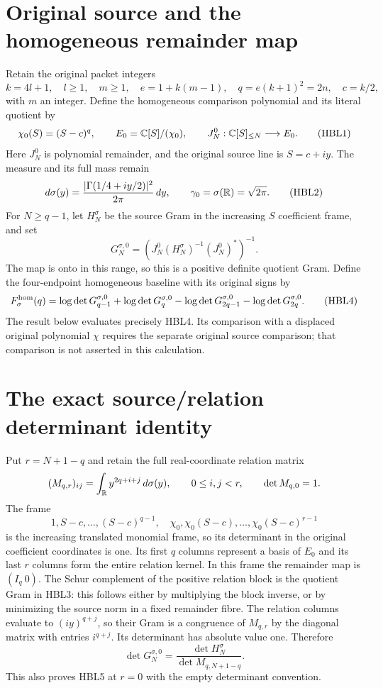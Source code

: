 


\section{Original source and the homogeneous remainder map}

Retain the original packet integers
\[
 k=4l+1,\quad l\ge1,\quad m\ge1,\quad
 e=1+k(m-1),\quad q=e(k+1)^2=2n,\quad c=k/2,
\]
with $m$ an integer. Define the homogeneous comparison polynomial and
its literal quotient by
\[
 \chi_0(S)=(S-c)^q,\qquad E_0=\mathbb C[S]/(\chi_0),\qquad
 J_N^0:\mathbb C[S]_{\le N}\longrightarrow E_0.
 \tag{HBL1}
\]
Here $J_N^0$ is polynomial remainder, and the original source line is
$S=c+iy$. The measure and its full mass remain
\[
 d\sigma(y)=\frac{|\Gamma(1/4+iy/2)|^2}{2\pi}\,dy,
 \qquad \gamma_0=\sigma(\mathbb R)=\sqrt{2\pi}.
 \tag{HBL2}
\]
For $N\ge q-1$, let $H_N^\sigma$ be the source Gram in the increasing
$S$ coefficient frame, and set
\[
 G_N^{\sigma,0}=(J_N^0(H_N^\sigma)^{-1}(J_N^0)^*)^{-1}.
 \tag{HBL3}
\]
The map is onto in this range, so this is a positive definite quotient
Gram. Define the four-endpoint homogeneous baseline with its original
signs by
\[
 F_\sigma^{\rm hom}(q)=
 \log\det G_{q-1}^{\sigma,0}+\log\det G_q^{\sigma,0}
 -\log\det G_{2q-1}^{\sigma,0}-\log\det G_{2q}^{\sigma,0}.
 \tag{HBL4}
\]
The result below evaluates precisely HBL4. Its comparison with a
displaced original polynomial $\chi$ requires the separate original
source comparison; that comparison is not asserted in this calculation.

\section{The exact source/relation determinant identity}

Put $r=N+1-q$ and retain the full real-coordinate relation matrix
\[
 (M_{q,r})_{ij}=\int_{\mathbb R}y^{2q+i+j}\,d\sigma(y),
 \qquad 0\le i,j<r,
 \qquad \det M_{q,0}=1.
\]
The frame
\[
 1,S-c,\ldots,(S-c)^{q-1},\quad
 \chi_0,\chi_0(S-c),\ldots,\chi_0(S-c)^{r-1}
\]
is the increasing translated monomial frame, so its determinant in
the original coefficient coordinates is one. Its first $q$ columns
represent a basis of $E_0$ and its last $r$ columns form the entire
relation kernel. In this frame the remainder map is $(I_q\ 0)$.
The Schur complement of the positive relation block is the quotient
Gram in HBL3: this follows either by multiplying the block inverse,
or by minimizing the source norm in a fixed remainder fibre.
The relation columns evaluate to $(iy)^{q+j}$, so their Gram is a
congruence of $M_{q,r}$ by the diagonal matrix with entries $i^{q+j}$.
Its determinant has absolute value one. Therefore
\[
 \boxed{\det G_N^{\sigma,0}
             =\frac{\det H_N^\sigma}{\det M_{q,N+1-q}}.}
 \tag{HBL5}
\]
This also proves HBL5 at $r=0$ with the empty determinant convention.

